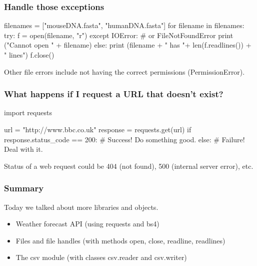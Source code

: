 \documentclass{beamer}
\begin{document}
\begin{frame}[fragile]
\frametitle{Handle those exceptions}
\begin{code} 
filenames = ["mouseDNA.fasta", "humanDNA.fasta"]
for filename in filenames:
   try:
      f = open(filename, "r")
   except IOError: # or FileNotFoundError
      print ("Cannot open " + filename)
   else:
      print (filename + " has "+ len(f.readlines()) 
               + " lines")
      f.close()
\end{code}
Other file errors include not having the correct permissions (PermissionError). 
\end{frame}


\begin{frame}[fragile]
\frametitle{What happens if I request a URL that doesn't exist?}
\begin{code}
import requests

url = "http://www.bbc.co.uk"
response = requests.get(url)
if response.status_code == 200:
   # Success! Do something good.
else:
   # Failure! Deal with it.
\end{code}
Status of a web request could be 404 (not found), 500 (internal server error), etc. 
\end{frame}


\begin{frame}[fragile]
\frametitle{Summary}
Today we talked about more libraries and objects. 
\begin{itemize}
\item Weather forecast API (using requests and bs4)
\item Files and file handles (with methods open, close, readline, readlines)
\item The csv module (with classes csv.reader and csv.writer)
\end{itemize}
\end{frame}
\end{document}
